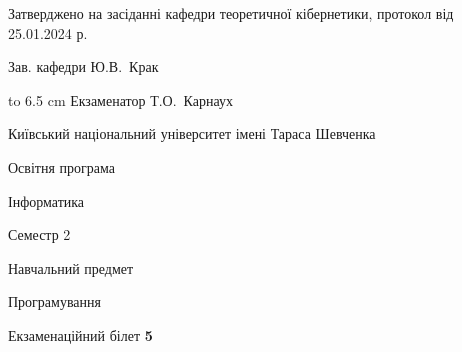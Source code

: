\documentclass[12pt, ukrainian]{article}
\begin{document}
{\smallskip\smallskip \begin {scriptsize} Затверджено на засіданні кафедри теоретичної кібернетики, протокол   від   25.01.2024 р.\par\smallskip\smallskip\smallskip\smallskip
{\parbox {6.5 cm} {Зав. кафедри \dotfill Ю.В.~Крак}}\hspace {0.7cm} {\hbox to 6.5 cm { Екзаменатор \dotfill Т.О.~Карнаух}} \end{scriptsize}}
\newpage
{{\begin {scriptsize}\par
{ \center  Київський національний університет імені Тараса Шевченка \par}
{\parbox {5 cm}{Освітня програма \hfill}{\parbox {7 cm}{Інформатика\hfill}}\parbox {6 cm}{\hfill Семестр 2}}\par
{\parbox {5 cm} {Навчальний предмет \hfill}\parbox {7 cm}{Програмування \hfill}\parbox {6cm}{\hfill}\par}\vspace{-15pt} \end{scriptsize}}{\center Екзаменаційний білет \No \textbf { 5 }\par}}
\end{document}
